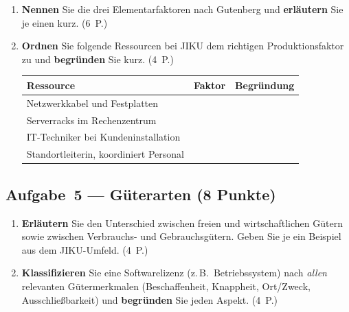 \documentclass[11pt, a4paper]{article}
\begin{document}
\begin{enumerate}[label=(\alph*)]
  \item \textbf{Nennen} Sie die drei Elementarfaktoren nach Gutenberg und
  \textbf{erläutern} Sie je einen kurz. \hfill (6~P.)

  \vspace{7cm}

  \item \textbf{Ordnen} Sie folgende Ressourcen bei JIKU dem richtigen Produktionsfaktor
  zu und \textbf{begründen} Sie kurz. \hfill (4~P.)

  \bigskip

  \noindent
  \begin{tabular}{|p{5.5cm}|p{3cm}|p{4.5cm}|}
  \hline
  \textbf{Ressource} & \textbf{Faktor} & \textbf{Begründung}\\
  \hline
  Netzwerkkabel und Festplatten & & \\[0.8cm]
  \hline
  Serverracks im Rechenzentrum & & \\[0.8cm]
  \hline
  IT-Techniker bei Kundeninstallation & & \\[0.8cm]
  \hline
  Standortleiterin, koordiniert Personal & & \\[0.8cm]
  \hline
  \end{tabular}
\end{enumerate}

\subsection*{Aufgabe~5 --- Güterarten (8 Punkte)}

\begin{enumerate}[label=(\alph*)]
  \item \textbf{Erläutern} Sie den Unterschied zwischen freien und wirtschaftlichen Gütern
  sowie zwischen Verbrauchs- und Gebrauchsgütern. Geben Sie je ein Beispiel aus dem
  JIKU-Umfeld. \hfill (4~P.)

  \vspace{6cm}

  \item \textbf{Klassifizieren} Sie eine Softwarelizenz (z.\,B.\ Betriebssystem) nach
  \emph{allen} relevanten Gütermerkmalen (Beschaffenheit, Knappheit, Ort/Zweck,
  Ausschließbarkeit) und \textbf{begründen} Sie jeden Aspekt. \hfill (4~P.)

  \vspace{6cm}
\end{enumerate}
\end{document}
